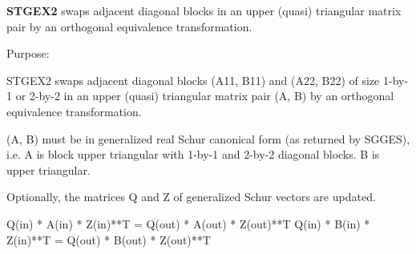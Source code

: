 {\bfseries S\+T\+G\+E\+X2} swaps adjacent diagonal blocks in an upper (quasi) triangular matrix pair by an orthogonal equivalence transformation. 

 \begin{DoxyParagraph}{Purpose\+: }
\begin{DoxyVerb} STGEX2 swaps adjacent diagonal blocks (A11, B11) and (A22, B22)
 of size 1-by-1 or 2-by-2 in an upper (quasi) triangular matrix pair
 (A, B) by an orthogonal equivalence transformation.

 (A, B) must be in generalized real Schur canonical form (as returned
 by SGGES), i.e. A is block upper triangular with 1-by-1 and 2-by-2
 diagonal blocks. B is upper triangular.

 Optionally, the matrices Q and Z of generalized Schur vectors are
 updated.

        Q(in) * A(in) * Z(in)**T = Q(out) * A(out) * Z(out)**T
        Q(in) * B(in) * Z(in)**T = Q(out) * B(out) * Z(out)**T\end{DoxyVerb}
 
\end{DoxyParagraph}

